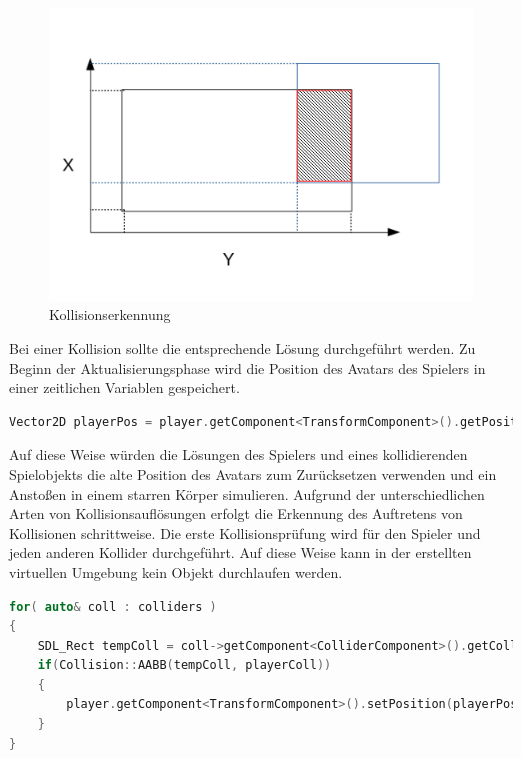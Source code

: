 \documentclass[
  10pt,
  a4paper,
  oneside,
  headers,
  headinclude,
  footinclude,
  BCOR5mm,
]{article}
\begin{document}
\begin{figure}[h]
  \centering
  \includegraphics[scale=0.75]{AABB_Collision}
  \caption{Kollisionserkennung}
  \label{fig:Kollisionserkennung}
\end{figure}

Bei einer Kollision sollte die entsprechende Lösung durchgeführt werden. Zu
Beginn der Aktualisierungsphase wird die Position des Avatars des Spielers in
einer zeitlichen Variablen gespeichert.

\begin{lstlisting}[language=C++]
Vector2D playerPos = player.getComponent<TransformComponent>().getPosition();
\end{lstlisting}

Auf diese Weise würden die Lösungen des Spielers und eines kollidierenden
Spielobjekts die alte Position des Avatars zum Zurücksetzen verwenden und ein
Anstoßen in einem starren Körper simulieren. Aufgrund der unterschiedlichen
Arten von Kollisionsauflösungen erfolgt die Erkennung des Auftretens von
Kollisionen schrittweise. Die erste Kollisionsprüfung wird für den Spieler und
jeden anderen Kollider durchgeführt. Auf diese Weise kann in der erstellten
virtuellen Umgebung kein Objekt durchlaufen werden.

\begin{lstlisting}[language=C++]
for( auto& coll : colliders )
{
    SDL_Rect tempColl = coll->getComponent<ColliderComponent>().getCollider();
    if(Collision::AABB(tempColl, playerColl))
    {
        player.getComponent<TransformComponent>().setPosition(playerPos);
    }
}
\end{lstlisting}
\end{document}
